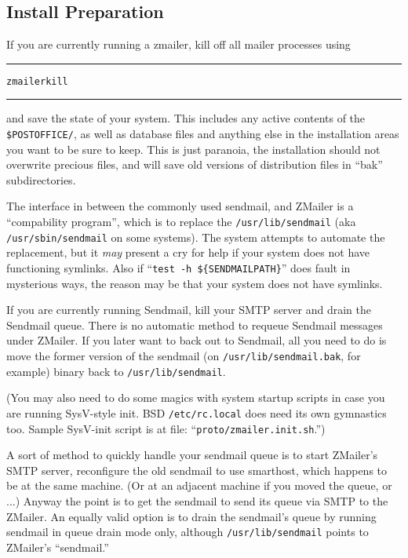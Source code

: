 \begin{multicols}{2}
\subsection{Install Preparation}%
%

If you are currently running a zmailer, kill off all mailer processes
using
\begin{alltt}\medskip\hrule\medskip
  zmailer kill
\medskip\hrule\end{alltt}\medskip

and save the state of your system.  This includes any active
contents of the {\tt\$POSTOFFICE/}, as well as database files and
anything else in the installation areas you want to be sure
to keep.  This is just paranoia, the installation should not
overwrite precious files, and will save old versions of
distribution files in ``bak'' subdirectories.

The interface in between the commonly used sendmail, and ZMailer
is a ``compability program'', which is to replace the {\tt /usr/lib/sendmail}
(aka {\tt /usr/sbin/sendmail} on some systems).
The system attempts to automate the replacement, but it {\em may}
present a cry for help if your system does not have functioning symlinks.
Also if ``{\tt test -h \$\{SENDMAILPATH\}}'' does fault in mysterious ways,
the reason may be that your system does not have symlinks.

If you are currently running Sendmail, kill your SMTP server
and drain the Sendmail queue.  There is no automatic method
to requeue Sendmail messages under ZMailer.  If you later want
to back out to Sendmail, all you need to do is move the former
version of the sendmail (on {\tt /usr/lib/sendmail.bak}, for example)
binary back to {\tt /usr/lib/sendmail}.

(You may also need to do some magics with system startup scripts
in case you are running SysV-style init. BSD {\tt /etc/rc.local}
does need its own gymnastics too.
Sample SysV-init script is at file: ``{\tt proto/zmailer.init.sh}.'')

A sort of method to quickly handle your sendmail queue is to
start ZMailer's SMTP server, reconfigure the old sendmail to
use smarthost, which happens to be at the same machine.
(Or at an adjacent machine if you moved the queue, or ...)
Anyway the point is to get the sendmail to send its queue
via SMTP to the ZMailer.
An equally valid option is to drain the sendmail's queue by running
sendmail in queue drain mode only, although {\tt /usr/lib/sendmail}
points to ZMailer's ``sendmail.''



\end{multicols}

